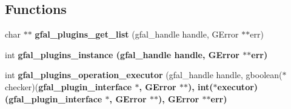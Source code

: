 \subsection*{Functions}
\begin{CompactItemize}
\item 
char $\ast$$\ast$ \textbf{gfal\_\-plugins\_\-get\_\-list} (gfal\_\-handle handle, GError $\ast$$\ast$err)\label{gfal__common__plugin_8c_59f53151c28e45f965a554a2a6806ad6}

\item 
int \bf{gfal\_\-plugins\_\-instance} (gfal\_\-handle handle, GError $\ast$$\ast$err)
\item 
int \textbf{gfal\_\-plugins\_\-operation\_\-executor} (gfal\_\-handle handle, gboolean($\ast$checker)(\bf{gfal\_\-plugin\_\-interface} $\ast$, GError $\ast$$\ast$), int($\ast$executor)(\bf{gfal\_\-plugin\_\-interface} $\ast$, GError $\ast$$\ast$), GError $\ast$$\ast$err)\label{gfal__common__plugin_8c_03cfec9717f9977a6e738574eb1f9ba4}


\end{CompactItemize}
